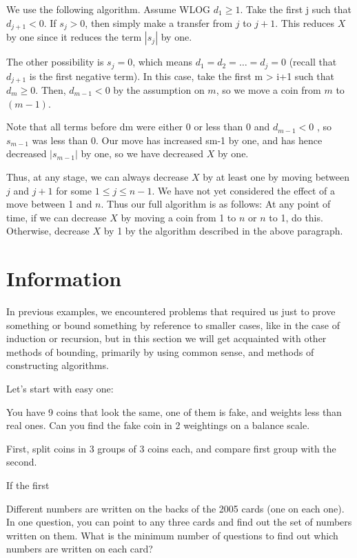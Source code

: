 We use the following algorithm. Assume WLOG $d_1 \geq 1$. Take the first j such that $d_{j+1} < 0$. If $s_j > 0$, then simply make a transfer from $j$ to $j + 1$. This reduces $X$ by one since it reduces the term $|s_j|$ by one.

The other possibility is $s_j = 0$, which means $d_1 = d_2 = \dots = d_j = 0$ (recall that $d_{j+1}$ is the first negative term). In this case, take the first m > i+1 such that $d_m \geq 0$. Then, $d_{m-1} < 0$ by the assumption on $m$, so we move a coin from $m$ to $(m-1)$.

Note that all terms before dm were either 0 or less than 0 and $d_{m-1} < 0$ , so $s_{m-1}$ was less than 0. Our move has increased sm-1 by one, and has hence decreased $|s_{m-1}|$ by one, so we have decreased $X$ by one.

Thus, at any stage, we can always decrease $X$ by at least one by moving between $j$ and $j +1$ for some $1 \le j \le n -1$. We have not yet considered the effect of a move between 1 and $n$. Thus our full algorithm is as follows: At any point of time, if we can decrease $X$ by moving a coin from 1 to $n$ or $n$ to 1, do this. Otherwise, decrease $X$ by 1 by the algorithm described in the above paragraph.

\newpage

\section{Information}

In previous examples, we encountered problems that required us just to prove something or bound something by reference to smaller cases, like in the case of induction or recursion, but in this section we will get acquainted with other methods of bounding, primarily by using common sense, and methods of constructing algorithms.  

Let's start with easy one:

\begin{example}
    You have 9 coins that look the same, one of them is fake, and weights less than real ones. Can you find the fake coin in 2 weightings on a balance scale.
\end{example}

First, split coins in 3 groups of 3 coins each, and compare first group with the second.

If the first 

\begin{example} [Russia 2005]
    Different numbers are written on the backs of the 2005 cards (one on each one). In one question, you can point to any three cards and find out the set of numbers written on them. What is the minimum number of questions to find out which numbers are written on each card?
\end{example}

